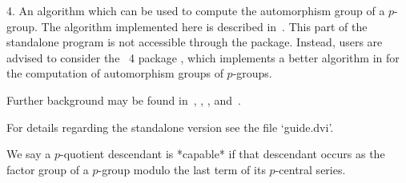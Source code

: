 \item{4.} 
An algorithm which can be used to compute the  automorphism  group  of  a
$p$-group. The algorithm implemented here is  described  in~\cite{OBr94}.
This part of  the  standalone  program  is  not  accessible  through  the
{\ANUPQ} package. Instead, users are advised  to  consider  the  {\GAP}~4
package {\AutPGrp}, which implements a better algorithm in {\GAP} for the
computation of automorphism groups of $p$-groups.

\endlist

Further   background   may   be   found   in~\cite{OBr95},   \cite{Vau84},
\cite{NNN98}, and~\cite{Sims94}.

For details regarding the standalone version see the file `guide.dvi'.

We say a $p$-quotient descendant is *capable* if that  descendant  occurs
as the  factor  group  of  a  $p$-group  modulo  the  last  term  of  its
$p$-central series.

